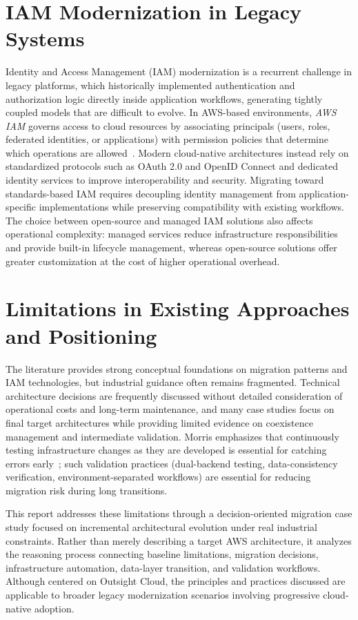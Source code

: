 \section{IAM Modernization in Legacy Systems}
Identity and Access Management (IAM) modernization is a recurrent challenge in legacy platforms, which historically implemented authentication and authorization logic directly inside application workflows, generating tightly coupled models that are difficult to evolve. In AWS-based environments, \emph{AWS IAM} governs access to cloud resources by associating principals (users, roles, federated identities, or applications) with permission policies that determine which operations are allowed~\cite{awsIamIntroduction}. Modern cloud-native architectures instead rely on standardized protocols such as OAuth 2.0 and OpenID Connect and dedicated identity services to improve interoperability and security. Migrating toward standards-based IAM requires decoupling identity management from application-specific implementations while preserving compatibility with existing workflows. The choice between open-source and managed IAM solutions also affects operational complexity: managed services reduce infrastructure responsibilities and provide built-in lifecycle management, whereas open-source solutions offer greater customization at the cost of higher operational overhead.

\section{Limitations in Existing Approaches and Positioning}
The literature provides strong conceptual foundations on migration patterns and IAM technologies, but industrial guidance often remains fragmented. Technical architecture decisions are frequently discussed without detailed consideration of operational costs and long-term maintenance, and many case studies focus on final target architectures while providing limited evidence on coexistence management and intermediate validation. Morris emphasizes that continuously testing infrastructure changes as they are developed is essential for catching errors early~\cite{morris2021iac}; such validation practices (dual-backend testing, data-consistency verification, environment-separated workflows) are essential for reducing migration risk during long transitions.

This report addresses these limitations through a decision-oriented migration case study focused on incremental architectural evolution under real industrial constraints. Rather than merely describing a target AWS architecture, it analyzes the reasoning process connecting baseline limitations, migration decisions, infrastructure automation, data-layer transition, and validation workflows. Although centered on Outsight Cloud, the principles and practices discussed are applicable to broader legacy modernization scenarios involving progressive cloud-native adoption.
